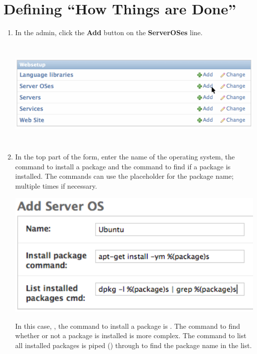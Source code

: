\documentclass[letterpaper,10pt,english]{manual}
\begin{document}
\hypertarget{howthingsaredone}{}\section{Defining ``How Things are Done''}
\begin{enumerate}
\item {} 
In the admin, click the \textbf{Add} button on the \textbf{ServerOSes} line.

\includegraphics[width=507pt,height=149pt]{add_serveros.png}

\item {} 
In the top part of the form, enter the name of the operating system, the command to install a package and the command to find if a package is installed. The commands can use the placeholder  for the package name; multiple times if necessary.

\includegraphics[width=363pt,height=173pt]{add_serveros_form.png}

In this case, , the command to install a package is . The command to find whether or not a package is installed is more complex. The command to list all installed packages  is piped (\code{\textbar{}}) through  to find the package name in the list.

\end{enumerate}
\hypertarget{howservicesareinstalled}{}
\end{document}
